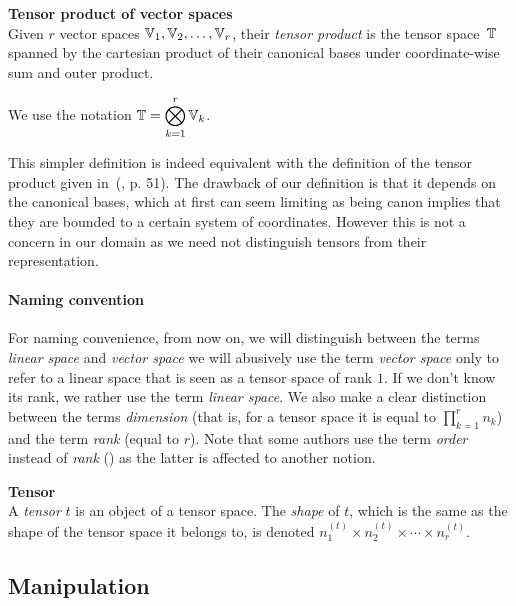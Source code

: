 \begin{definition}\textbf{Tensor product of vector spaces}\\
Given $r$ vector spaces $\mathbb{V}_1, \mathbb{V}_2, \ldots, \mathbb{V}_r$, their \emph{tensor product} is the tensor space~$\mathbb{T}$ spanned by the cartesian product of their canonical bases under coordinate-wise sum and outer product.

We use the notation $\mathbb{T} = \displaystyle \bigotimes_{k=1}^r \mathbb{V}_k$.
\end{definition}

\begin{remark}
This simpler definition is indeed equivalent with the definition of the tensor product given in~(\cite{hackbusch2012tensor}, p. 51). The drawback of our definition is that it depends on the canonical bases, which at first can seem limiting as being canon implies that they are bounded to a certain system of coordinates. However this is not a concern in our domain as we need not distinguish tensors from their representation.
\end{remark}

\paragraph{Naming convention}
For naming convenience, from now on, we will distinguish between the terms \emph{linear space} and \emph{vector space} \ie we will abusively use the term \emph{vector space} only to refer to a linear space that is seen as a tensor space of rank $1$. If we don't know its rank, we rather use the term \emph{linear space}.
We also make a clear distinction between the terms \emph{dimension} (that is, for a tensor space it is equal to $\prod_{k=1}^r n_k$) and the term \emph{rank} (equal to $r$). Note that some authors use the term \emph{order} instead of \emph{rank} (\eg \cite{hackbusch2012tensor}) as the latter is affected to another notion.

\begin{definition}\textbf{Tensor}\\
A \emph{tensor} $t$ is an object of a tensor space. The \emph{shape} of $t$, which is the same as the shape of the tensor space it belongs to, is denoted $n_1^{(t)} \times n_2^{(t)} \times \cdots \times n_r^{(t)}$.
\end{definition}

\subsection{Manipulation}

